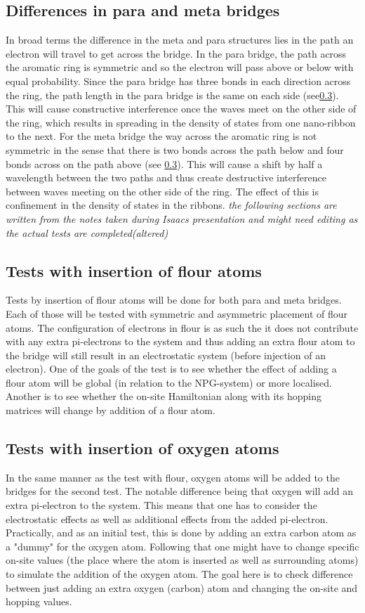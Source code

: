 \subsection{Differences in para and meta bridges}
In broad terms the difference in the meta and para structures lies in the path an electron will travel to get across the bridge. In the para bridge, the path across the aromatic ring is symmetric and so the electron will pass above or below with equal probability. Since the para bridge has three bonds in each direction across the ring, the path length in the para bridge is the same on each side (see\cref{}). This will cause constructive interference once the waves meet on the other side of the ring, which results in spreading in the density of states from one nano-ribbon to the next. For the meta bridge the way across the aromatic ring is not symmetric in the sense that there is two bonds across the path below and four bonds across on the path above (see \cref{}). This will cause a shift by half a wavelength between the two paths and thus create destructive interference between waves meeting on the other side of the ring. The effect of this is confinement in the density of states in the ribbons. 
\textit{the following sections are written from the notes taken during Isaacs presentation and might need editing as the actual tests are completed(altered)}
\subsection{Tests with insertion of flour atoms}
Tests by insertion of flour atoms will be done for both para and meta bridges. Each  of those will be tested with symmetric and asymmetric placement of flour atoms. The configuration of electrons in flour is as such the it does not contribute with any extra pi-electrons to the system and thus adding an extra flour atom to the bridge will still result in an electrostatic system (before injection of an electron). One of the goals of the test is to see whether the effect of adding a flour atom will be global (in relation to the NPG-system) or more localised. Another is to see whether the on-site Hamiltonian along with its hopping matrices will change by addition of a flour atom. 
\subsection{Tests with insertion of oxygen atoms}
In the same manner as the test with flour, oxygen atoms will be added to the bridges for the second test. The notable difference being that oxygen will add an extra pi-electron to the system. This means that one has to consider the electrostatic effects as well as additional effects from the added pi-electron. Practically, and as an initial test, this is done by adding an extra carbon atom as a "dummy" for the oxygen atom. Following that one might have to change specific on-site values (the place where the atom is inserted as well as surrounding atoms) to simulate the addition of the oxygen atom. The goal here is to check difference between just adding an extra oxygen (carbon) atom and changing the on-site and hopping values. 
